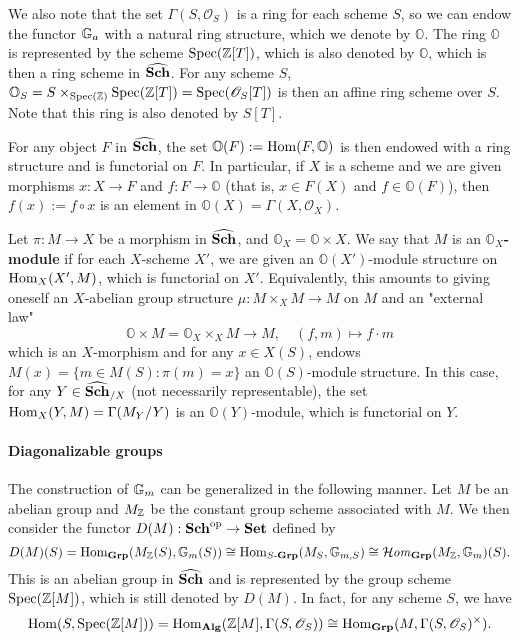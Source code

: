 We also note that the set $\Gamma(S,\mathscr{O}_S)$ is a ring for each scheme $S$, so we can endow the functor $\mathbb{G}_a$ with a natural ring structure, which we denote by $\mathbb{O}$. The ring $\mathbb{O}$ is represented by the scheme $\mathrm{Spec}(\mathbb{Z}[T])$, which is also denoted by $\mathbb{O}$, which is then a ring scheme in $\widehat{\mathbf{Sch}}$. For any scheme $S$, $\mathbb{O}_S=S\times_{\mathrm{Spec}(\mathbb{Z})}\mathrm{Spec}(\mathbb{Z}[T])=\mathrm{Spec}(\mathscr{O}_S[T])$ is then an affine ring scheme over $S$. Note that this ring is also denoted by $S[T]$.\par
For any object $F$ in $\widehat{\mathbf{Sch}}$, the set $\mathbb{O}(F):=\mathrm{Hom}(F,\mathbb{O})$ is then endowed with a ring structure and is functorial on $F$. In particular, if $X$ is a scheme and we are given morphisms $x:X\to F$ and $f:F\to\mathbb{O}$ (that is, $x\in F(X)$ and $f\in\mathbb{O}(F)$), then $f(x):=f\circ x$ is an element in $\mathbb{O}(X)=\Gamma(X,\mathscr{O}_X)$.

\begin{definition}
Let $\pi:M\to X$ be a morphism in $\widehat{\mathbf{Sch}}$, and $\mathbb{O}_X=\mathbb{O}\times X$. We say that $M$ is an \textbf{$\mathbb{O}_X$-module} if for each $X$-scheme $X'$, we are given an $\mathbb{O}(X')$-module structure on $\mathrm{Hom}_X(X',M)$, which is functorial on $X'$. Equivalently, this amounts to giving oneself an $X$-abelian group structure $\mu:M\times_XM\to M$ on $M$ and an "external law"
\[\mathbb{O}\times M=\mathbb{O}_X\times_XM\to M,\quad (f,m)\mapsto f\cdot m\]
which is an $X$-morphism and for any $x\in X(S)$, endows $M(x)=\{m\in M(S):\pi(m)=x\}$ an $\mathbb{O}(S)$-module structure. In this case, for any $Y\in\widehat{\mathbf{Sch}}_{/X}$ (not necessarily representable), the set $\mathrm{Hom}_X(Y,M)=\Gamma(M_Y/Y)$ is an $\mathbb{O}(Y)$-module, which is functorial on $Y$.
\end{definition}

\paragraph{Diagonalizable groups}\label{scheme diagonalizable group paragraph}
The construction of $\mathbb{G}_m$ can be generalized in the following manner. Let $M$ be an abelian group and $M_{\mathbb{Z}}$ be the constant group scheme associated with $M$. We then consider the functor $D(M):\mathbf{Sch}^{\mathrm{op}}\to\mathbf{Set}$ defined by
\[D(M)(S)=\mathrm{Hom}_{\mathbf{Grp}}(M_{\mathbb{Z}}(S),\mathbb{G}_m(S))\cong \mathrm{Hom}_{S\textup{-}\mathbf{Grp}}(M_S,\mathbb{G}_{m,S})\cong \operatorname{\mathcal{H}\hspace*{-0.4pt}\textit{om}\hspace{0.5pt}}_{\mathbf{Grp}}(M_{\mathbb{Z}},\mathbb{G}_m)(S).\]
This is an abelian group in $\widehat{\mathbf{Sch}}$ and is represented by the group scheme $\mathrm{Spec}(\mathbb{Z}[M])$, which is still denoted by $D(M)$. In fact, for any scheme $S$, we have
\[\mathrm{Hom}(S,\mathrm{Spec}(\mathbb{Z}[M]))=\mathrm{Hom}_{\mathbf{Alg}}(\mathbb{Z}[M],\Gamma(S,\mathscr{O}_S))\cong\mathrm{Hom}_{\mathbf{Grp}}(M,\Gamma(S,\mathscr{O}_S)^{\times}).\]

